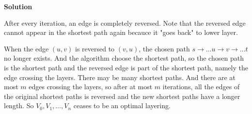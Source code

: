 \textbf{Solution}

After every iteration, an edge is completely reversed. Note that the reversed edge cannot appear in the shortest path again becauce it "goes back" to lower layer.

When the edge $(u,v)$ is reversed to $(v,u)$, the chosen path $s \rightarrow \dots u \rightarrow v \rightarrow \dots t$ no longer exists. And the algorithm choose the shortest path, so the chosen path is the shortest path and the reversed edge is part of the shortest path, namely the edge crossing the layers. There may be many shortest paths. And there are at most $m$ edges crossing the layers, so after at most $m$ iterations, all the edges of the original shortest paths is reversed and the new shortest paths have a longer length. So $V_0, V_1, \dots, V_n$ ceases to be an optimal layering.
